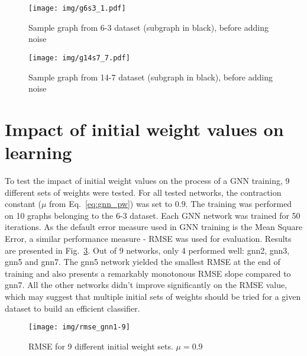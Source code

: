 \begin{figure}[h!]
\begin{center}
	\texttt{[image: img/g6s3\_1.pdf]}
	\caption{Sample graph from 6-3 dataset (subgraph in black), before adding noise}
	\label{fig:gnn_g6s3}
\end{center}
\end{figure}

\begin{figure}[h!]
\begin{center}
	\texttt{[image: img/g14s7\_7.pdf]}
	\caption{Sample graph from 14-7 dataset (subgraph in black), before adding noise}
	\label{fig:gnn_g6s3}
\end{center}
\end{figure}

\section{Impact of initial weight values on learning}
To test the impact of initial weight values on the process of a GNN training, 9 different sets of weights were tested. For all tested networks, the contraction constant ($\mu$ from Eq.~\ref{eq:gnn_pw}) was set to $0.9$. The training was performed on 10 graphs belonging to the 6-3 dataset. Each GNN network was trained for 50 iterations. As the default error measure used in GNN training is the Mean Square Error, a similar performance measure - RMSE was used for evaluation. Results are presented in Fig.~\ref{fig:gnn_multiple}. Out of 9 networks, only 4 performed well: gnn2, gnn3, gnn5 and gnn7. The gnn5 network yielded the smallest RMSE at the end of training and also presents a remarkably monotonous RMSE slope compared to gnn7. All the other networks didn't improve significantly on the RMSE value, which may suggest that multiple initial sets of weights should be tried for a given dataset to build an efficient classifier.

\begin{figure}[h!]
\begin{center}
	\texttt{[image: img/rmse\_gnn1-9]}
	\caption{RMSE for 9 different initial weight sets. $\mu = 0.9$}
	\label{fig:gnn_multiple}
\end{center}
\end{figure}

\newpage
